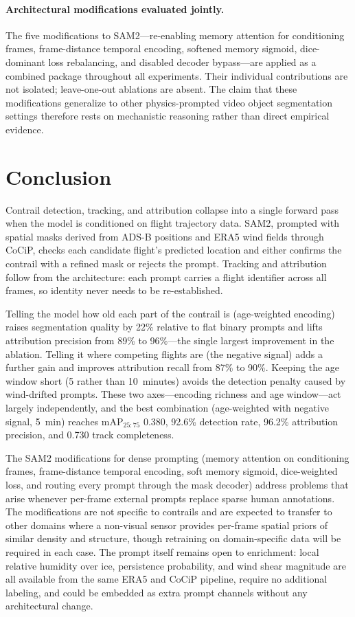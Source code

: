 \documentclass[review]{elsarticle}
\begin{document}
\paragraph{Architectural modifications evaluated jointly.} The five modifications to SAM2---re-enabling memory attention for conditioning frames, frame-distance temporal encoding, softened memory sigmoid, dice-dominant loss rebalancing, and disabled decoder bypass---are applied as a combined package throughout all experiments. Their individual contributions are not isolated; leave-one-out ablations are absent. The claim that these modifications generalize to other physics-prompted video object segmentation settings therefore rests on mechanistic reasoning rather than direct empirical evidence.


\section{Conclusion}

Contrail detection, tracking, and attribution collapse into a single forward pass when the model is conditioned on flight trajectory data. SAM2, prompted with spatial masks derived from ADS-B positions and ERA5 wind fields through CoCiP, checks each candidate flight's predicted location and either confirms the contrail with a refined mask or rejects the prompt. Tracking and attribution follow from the architecture: each prompt carries a flight identifier across all frames, so identity never needs to be re-established.

Telling the model how old each part of the contrail is (age-weighted encoding) raises segmentation quality by 22\% relative to flat binary prompts and lifts attribution precision from 89\% to 96\%---the single largest improvement in the ablation. Telling it where competing flights are (the negative signal) adds a further gain and improves attribution recall from 87\% to 90\%. Keeping the age window short (5 rather than 10~minutes) avoids the detection penalty caused by wind-drifted prompts. These two axes---encoding richness and age window---act largely independently, and the best combination (age-weighted with negative signal, 5~min) reaches mAP$_{25{:}75}$ 0.380, 92.6\% detection rate, 96.2\% attribution precision, and 0.730 track completeness.

The SAM2 modifications for dense prompting (memory attention on conditioning frames, frame-distance temporal encoding, soft memory sigmoid, dice-weighted loss, and routing every prompt through the mask decoder) address problems that arise whenever per-frame external prompts replace sparse human annotations. The modifications are not specific to contrails and are expected to transfer to other domains where a non-visual sensor provides per-frame spatial priors of similar density and structure, though retraining on domain-specific data will be required in each case. The prompt itself remains open to enrichment: local relative humidity over ice, persistence probability, and wind shear magnitude are all available from the same ERA5 and CoCiP pipeline, require no additional labeling, and could be embedded as extra prompt channels without any architectural change.
\end{document}
